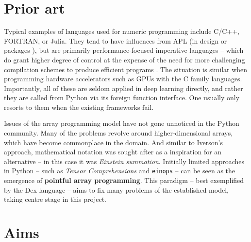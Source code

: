 \section{Prior art}

Typical examples of languages used for numeric programming include C/C++, FORTRAN, or Julia. They tend to have influences from APL (in design \cite{bernecky1991fortran} or packages \cite{eigenweb}), but are primarily performance-focused imperative languages -- which do grant higher degree of control at the expense of the need for more challenging compilation schemes to produce efficient programs \cite{grosser2012polly}. The situation is similar when programming hardware accelerators such as GPUs with the C family languages. Importantly, all of these are seldom applied in deep learning directly, and rather they are called from Python via its foreign function interface. One usually only resorts to them when the existing frameworks fail.

Issues of the array programming model have not gone unnoticed in the Python community. Many of the problems revolve around higher-dimensional arrays, which have become commonplace in the domain. And similar to Iverson's approach, mathematical notation was sought after as a inspiration for an alternative -- in this case it was \textit{Einstein summation}. Initially limited approaches in Python -- such as \textit{Tensor Comprehensions} \cite{vasilache2018tensor} and \texttt{einops} \cite{rogozhnikov2021einops} -- can be seen as the emergence of \textbf{pointful array programming}. This paradigm -- best exemplified by the Dex language \cite{paszke2021getting} -- aims to fix many problems of the established model, taking centre stage in this project. 

\section{Aims}

